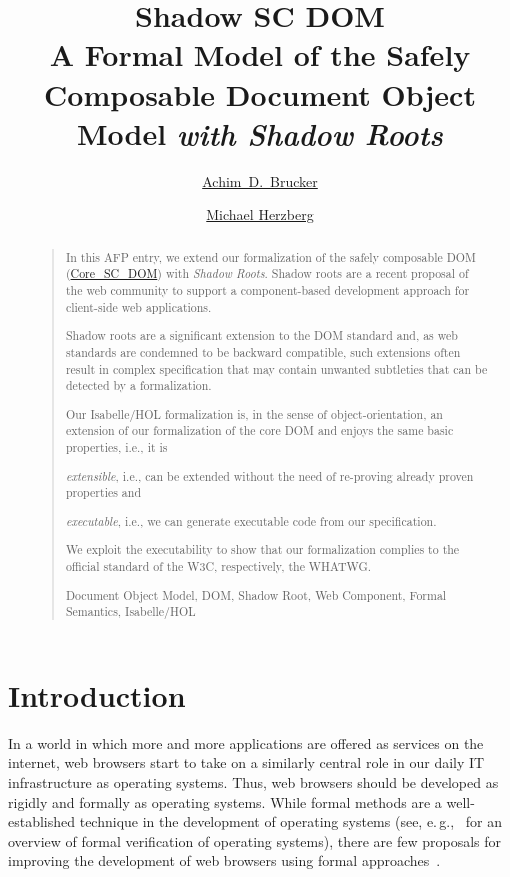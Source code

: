 \documentclass[10pt,DIV16,a4paper,abstract=true,twoside=semi,openright]
{scrreprt}
\title{Shadow SC DOM\\\medskip \Large 
  A Formal Model of the Safely Composable Document Object Model \emph{with Shadow Roots}}%
\author{%
  \href{https://www.brucker.ch/}{Achim~D.~Brucker}\footnotemark[1]
  \and
  \href{https://www.michael-herzberg.de/}{Michael Herzberg}\footnotemark[2]
}
\newcommand{\eg}{e.\,g.\xspace}
\begin{document}
  \maketitle
  \begin{abstract}
    \begin{quote}
      In this AFP entry, we extend our formalization of the safely
      composable  DOM
      (\href{https://www.isa-afp.org/entries/Core_SC_DOM.html}
      {Core\_SC\_DOM}) with \emph{Shadow Roots}. Shadow roots are a recent
      proposal of the web community to support a component-based
      development approach for client-side web applications. 

      Shadow roots are a significant extension to the DOM standard
      and, as web standards are condemned to be backward compatible,
      such extensions often result in complex specification that may
      contain unwanted subtleties that can be detected by a
      formalization.

      Our Isabelle/HOL formalization is, in the sense of
      object-orientation, an extension of our formalization of the
      core DOM and enjoys the same basic properties, i.e., it is
      \begin{inparaenum}
        \item \emph{extensible}, i.e., can be extended without the need of
              re-proving already proven properties and
        \item \emph{executable}, i.e., we can generate executable code
          from our specification.
      \end{inparaenum}
      We exploit the executability to show that our formalization
      complies to the official standard of the W3C, respectively,
      the WHATWG.

      \bigskip
      Document Object Model, DOM, Shadow Root, Web Component, Formal
      Semantics, Isabelle/HOL
    \end{quote}
  \end{abstract}


\tableofcontents
\cleardoublepage

\chapter{Introduction}

In a world in which more and more applications are offered as services
on the internet, web browsers start to take on a similarly central
role in our daily IT infrastructure as operating systems. Thus, web
browsers should be developed as rigidly and formally as operating
systems. While formal methods are a well-established technique in the
development of operating systems (see,
\eg,~\citet{klein:operating:2009} for an overview of formal
verification of operating systems), there are few proposals for
improving the development of web browsers using formal
approaches~\cite{gardner.ea:dom:2008,raad.ea:dom:2016,jang.ea:establishing:2012,bohannon.ea:featherweight:2010}.
\end{document}
